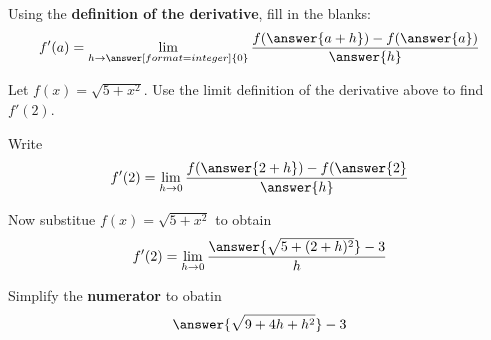 \documentclass{ximera}
\begin{document}
\begin{exercise}

Using the \textbf{definition of the derivative}, fill in the blanks:
  \[
  f'(a)=
  \lim_{h\to\answer[format=integer]{0}}
  \frac{f(\answer{a+h})-f(\answer{a})}{\answer{h}}
  \]


\begin{exercise}
  Let $f(x)=\sqrt{5+x^2}$. Use the limit definition of the derivative
  above to find $f'(2)$.  
  \begin{exercise}
    Write
    \[
    f'(2) = \lim_{h\to 0}\frac{f(\answer{2+h}) -f(\answer{2}}{\answer{h}}
    \]
    \begin{exercise}
      Now substitue $f(x) = \sqrt{5+x^2}$ to obtain
      \[
      f'(2) = \lim_{h\to 0} \frac{\answer{\sqrt{5+(2+h)^2}}-3}{h}
      \]
      \begin{exercise}
        Simplify the \textbf{numerator} to obatin
        \[
        \answer{\sqrt{9 + 4h + h^2}}-3
        \]
      \end{exercise}
    \end{exercise}
  \end{exercise}
  \end{exercise}

\end{exercise}
\end{document}

